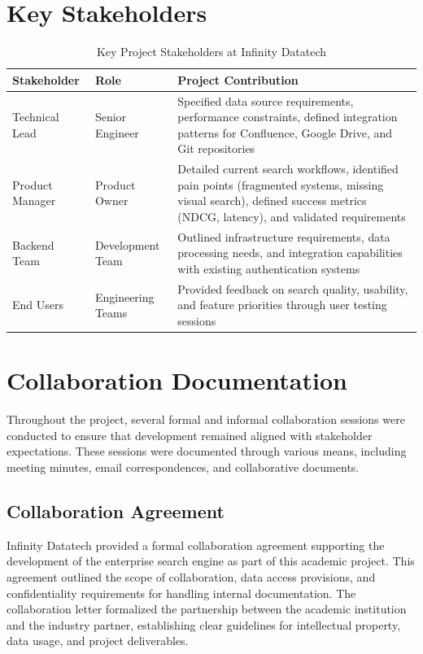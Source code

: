 \documentclass{report}
\begin{document}
\section{Key Stakeholders}

\begin{table}[H]
\centering
\caption{Key Project Stakeholders at Infinity Datatech}
\label{tab:stakeholders}
\begin{tabularx}{\textwidth}{|l|X|X|}
\hline
\textbf{Stakeholder} & \textbf{Role} & \textbf{Project Contribution} \\ 
\hline
Technical Lead & Senior Engineer & Specified data source requirements, performance constraints, defined integration patterns for Confluence, Google Drive, and Git repositories \\
\hline
Product Manager & Product Owner & Detailed current search workflows, identified pain points (fragmented systems, missing visual search), defined success metrics (NDCG, latency), and validated requirements \\
\hline
Backend Team & Development Team & Outlined infrastructure requirements, data processing needs, and integration capabilities with existing authentication systems \\
\hline
End Users & Engineering Teams & Provided feedback on search quality, usability, and feature priorities through user testing sessions \\
\hline
\end{tabularx}
\end{table}

\section{Collaboration Documentation}

Throughout the project, several formal and informal collaboration sessions were conducted to ensure that development remained aligned with stakeholder expectations. These sessions were documented through various means, including meeting minutes, email correspondences, and collaborative documents.

\subsection{Collaboration Agreement}

Infinity Datatech provided a formal collaboration agreement supporting the development of the enterprise search engine as part of this academic project. This agreement outlined the scope of collaboration, data access provisions, and confidentiality requirements for handling internal documentation. The collaboration letter formalized the partnership between the academic institution and the industry partner, establishing clear guidelines for intellectual property, data usage, and project deliverables.
\end{document}
